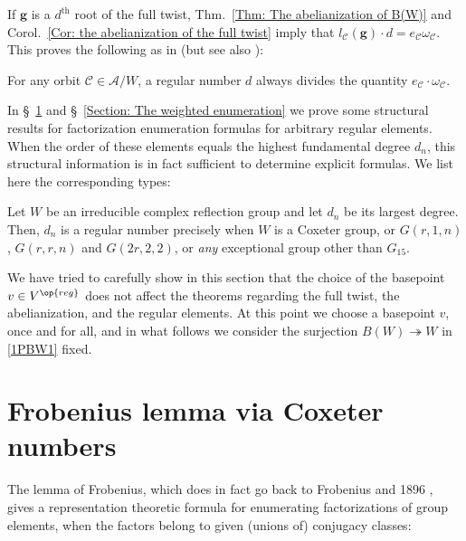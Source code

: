 If $\bm g$ is a $d^{\text{th}}$ root of the full twist, Thm.~\ref{Thm: The abelianization of B(W)} and Corol.~\ref{Cor: the abelianization of the full twist} imply that $l_{\mathcal{C}}(\bm g)\cdot d=e_{\mathcal{C}}\omega_{\mathcal{C}}$. This proves the following as in \cite[Thm.~3.2]{reiner-delMas-Hameister} (but see also \cite[Prop.~5.17:(2)]{broue-book-braid-groups}):

\begin{coro}\label{Corol: regular numbers divide e_co_c}
For any orbit $\mathcal{C}\in\mathcal{A}/W$, a regular number $d$ always divides the quantity $e_{\mathcal{C}}\cdot\omega_\mathcal{C}$.
\end{coro}


In \S~\ref{Section: Frobenius lemma via Coxeter numbers} and \S~\ref{Section: The weighted enumeration} we prove some structural results for factorization enumeration formulas for arbitrary regular elements. When the order of these elements equals the highest fundamental degree $d_n$, this structural information is in fact sufficient to determine explicit formulas. We list here the corresponding types:

\begin{prop}\label{Prop: When d_n is regular}
Let $W$ be an irreducible complex reflection group and let $d_n$ be its largest degree. Then, $d_n$ is a regular number precisely when $W$ is a Coxeter group, or $G(r,1,n)$, $G(r,r,n)$ and $G(2r,2,2)$, or \emph{any} exceptional group other than $G_{15}$.
\end{prop} 

\begin{rema}\label{Remark: We can disregard the basepoint}
We have tried to carefully show in this section that the choice of the basepoint $v\in V^{\op{reg}}$ does not affect the theorems regarding the full twist, the abelianization, and the regular elements. At this point we choose a basepoint $v$, once and for all, and in what follows we consider the surjection $B(W)\twoheadrightarrow W$ in \eqref{1PBW1} fixed.
\end{rema}

\section{Frobenius lemma via Coxeter numbers}
\label{Section: Frobenius lemma via Coxeter numbers}

The lemma of Frobenius, which does in fact go back to Frobenius and 1896 \cite{frobenius-collected-works}, gives a representation theoretic formula for enumerating factorizations of group elements, when the factors belong to given (unions of) conjugacy classes:

